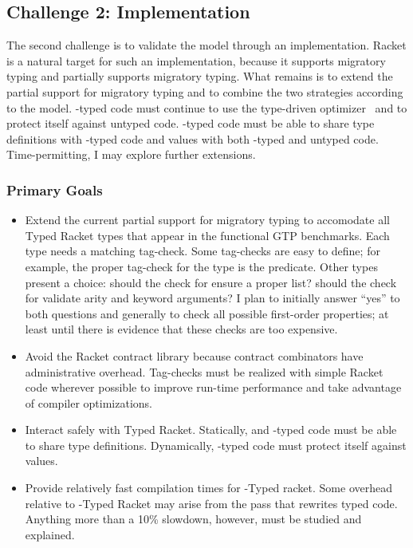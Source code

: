 \subsection{Challenge 2: Implementation}

The second challenge is to validate the model through an implementation.
Racket is a natural target for such an implementation, because it supports
 \tdeep{} migratory typing and partially supports \tshallow{} migratory typing.
What remains is to extend the partial support for \tshallow{} migratory typing
 and to combine the two strategies according to the model.
\tDeep{}-typed code must continue to use the type-driven optimizer~\cite{stff-padl-2012}
 and to protect itself against untyped code.
\tShallow{}-typed code must be able to share type definitions with
 \tdeep{}-typed code and values with both \tdeep{}-typed and untyped code.
Time-permitting, I may explore further extensions.


\subsubsection{Primary Goals}

\begin{itemize}
  \item
    Extend the current partial support for \tshallow{} migratory typing
     to accomodate all Typed Racket types that appear in the functional GTP
     benchmarks.
    Each type needs a matching tag-check.
    Some tag-checks are easy to define; for example, the proper tag-check for
     the  type is the  predicate.
    Other types present a choice:
     should the check for  ensure a proper list?
     should the check for \racketcode{->*} validate arity and keyword arguments?
    I plan to initially answer ``yes'' to both questions and generally to check
     all possible first-order properties; at least until there is evidence
     that these checks are too expensive.
  \item
    Avoid the Racket contract library
    because contract combinators have administrative overhead.
    Tag-checks must be realized with simple Racket code wherever possible to
     improve run-time performance and take advantage of compiler optimizations.
  \item
    Interact safely with Typed Racket.
    Statically, \tshallow{} and \tdeep{}-typed code must be able to share type definitions.
    Dynamically, \tdeep{}-typed code must protect itself against \tshallow{} values.
  \item
    Provide relatively fast compilation times for \tshallow{}-Typed racket.
    Some overhead relative to \tdeep{}-Typed Racket may arise from the pass that
    rewrites typed code.
    Anything more than a 10\% slowdown, however, must be studied and explained.
\end{itemize}



